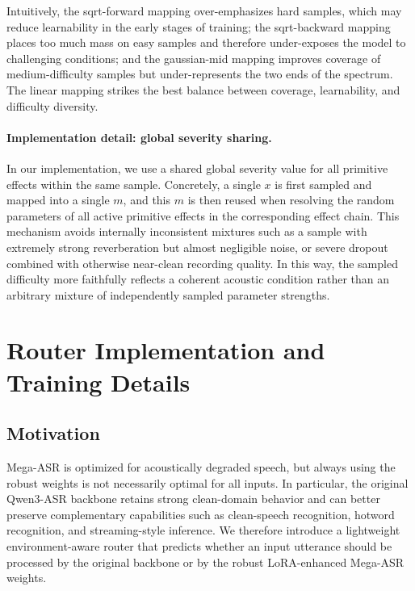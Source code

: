 \documentclass{article}
\begin{document}
Intuitively, the sqrt-forward mapping over-emphasizes hard samples, which may
reduce learnability in the early stages of training; the sqrt-backward mapping
places too much mass on easy samples and therefore under-exposes the model to
challenging conditions; and the gaussian-mid mapping improves coverage of
medium-difficulty samples but under-represents the two ends of the spectrum.
The linear mapping strikes the best balance between coverage, learnability, and
difficulty diversity.



\paragraph{Implementation detail: global severity sharing.}
In our implementation, we use a shared global severity value for all primitive
effects within the same sample. Concretely, a single $x$ is first sampled and
mapped into a single $m$, and this $m$ is then reused when resolving the random
parameters of all active primitive effects in the corresponding effect chain.
This mechanism avoids internally inconsistent mixtures such as a sample with
extremely strong reverberation but almost negligible noise, or severe dropout
combined with otherwise near-clean recording quality. In this way, the sampled
difficulty more faithfully reflects a coherent acoustic condition rather than an
arbitrary mixture of independently sampled parameter strengths.

\newpage
\section{Router Implementation and Training Details}

\subsection{Motivation}

Mega-ASR is optimized for acoustically degraded speech, but always using the
robust weights is not necessarily optimal for all inputs. In particular, the
original Qwen3-ASR backbone retains strong clean-domain behavior and can better
preserve complementary capabilities such as clean-speech recognition, hotword
recognition, and streaming-style inference. We therefore introduce a lightweight
environment-aware router that predicts whether an input utterance should be
processed by the original backbone or by the robust LoRA-enhanced Mega-ASR
weights.
\end{document}
